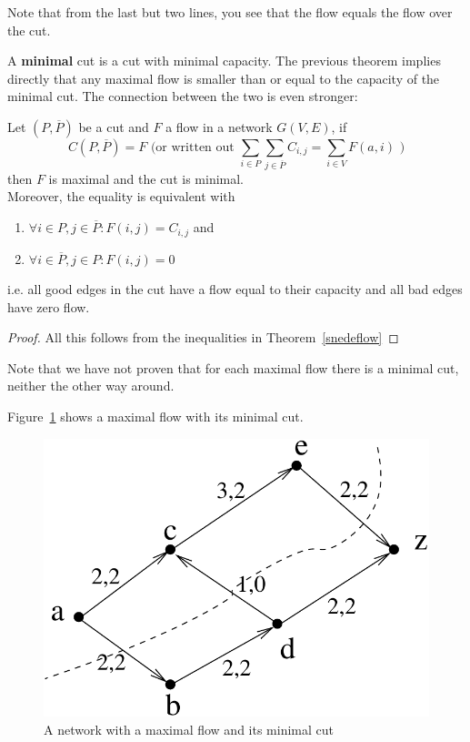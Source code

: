 Note that from the last but two lines, you see that the flow equals
the flow over the cut.



A \textbf{minimal} cut is a cut with minimal capacity. The previous
theorem implies directly that any maximal flow is smaller than or
equal to the capacity of the minimal cut. The connection between the
two is even stronger:


 \begin{theorem}
  Let $(P,\overline{P})$ be a cut and $F$ a flow in a network $G(V,E)$,
if
\[C(P,\overline{P})=F\mbox{ \ \ (or written out }
\sum_{i \in P} \sum_{j \in \overline{P}} C_{i,j} = \sum_{i \in V} F(a,i)
 \mbox{ )}\]
 then $F$ is maximal and the cut is minimal.\\
  Moreover, the equality is equivalent with
\begin{enumerate}
\item
$\forall i \in P, j \in \overline{P}: F(i,j) = C_{i,j}$ and
\item
$\forall i \in \overline{P}, j \in P: F(i,j) = 0$
\end{enumerate}
i.e. all good edges in the cut have a flow equal to their capacity and
all bad edges have zero flow.
\end{theorem}
\begin{proof}
All this follows from the inequalities in Theorem~\ref{snedeflow}
\end{proof}

Note that we have not proven that for each maximal flow there is a
minimal cut, neither the other way around.



Figure~\ref{snede2} shows a maximal flow with its minimal cut.

\begin{figure}[ht]
\begin{center}
\includegraphics[width=0.35\linewidth,keepaspectratio]{snede2} %
\end{center}
\caption{A network with a maximal flow and its minimal cut\label{snede2}}
\end{figure}

